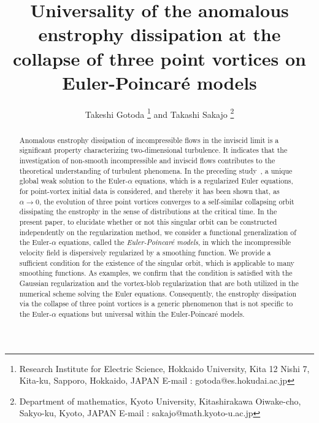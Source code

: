 \documentclass{article}
\title{Universality of the anomalous enstrophy dissipation at the collapse of three point vortices on Euler-Poincar\'{e} models}
\author{Takeshi Gotoda \footnote{Research Institute for Electric Science, Hokkaido University, Kita 12 Nishi 7, Kita-ku, Sapporo,  Hokkaido, JAPAN  E-mail : gotoda@es.hokudai.ac.jp} 
and Takashi Sakajo \footnote{Department of mathematics, Kyoto University, Kitashirakawa Oiwake-cho, Sakyo-ku, Kyoto, JAPAN  E-mail : sakajo@math.kyoto-u.ac.jp} 
}
\date{}
\theoremstyle{definition}
\begin{document}
\maketitle



\begin{abstract}
Anomalous enstrophy dissipation of incompressible flows in the inviscid limit is a significant property characterizing two-dimensional turbulence. It indicates that the investigation of non-smooth incompressible and inviscid flows contributes to the theoretical understanding of turbulent phenomena.  In the preceding study~\cite{G.2}, a unique global weak solution to the Euler-$\alpha$ equations, which is a regularized Euler equations, for point-vortex initial data is considered, and thereby it has been shown that, as $\alpha \rightarrow 0$, the evolution of three point vortices converges to a self-similar collapsing orbit dissipating the enstrophy  in the sense of distributions at the critical time. In the present paper, to elucidate whether or not this singular orbit can be constructed independently on the regularization method, we consider a functional generalization of the Euler-$\alpha$ equations,  called the \textit{Euler-Poincar\'{e} models}, in which the incompressible velocity field is dispersively regularized by a smoothing function. We provide a sufficient condition for the existence of the singular orbit, which is applicable to many smoothing functions. As examples, we confirm that the condition is satisfied with the Gaussian regularization and  the vortex-blob regularization that are both utilized in the numerical scheme solving the Euler equations.
Consequently, the enstrophy dissipation via the collapse of three point vortices is a generic phenomenon that is not specific to the Euler-$\alpha$ equations but universal within the Euler-Poincar\'{e} models.
\end{abstract}




\end{document}
